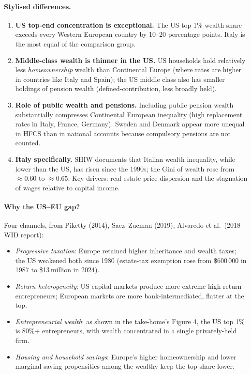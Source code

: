 \documentclass[11pt,a4paper]{article}
\begin{document}
\paragraph{Stylised differences.}
\begin{enumerate}[leftmargin=*,itemsep=1pt]
    \item \textbf{US top-end concentration is exceptional.} The US top 1\% wealth share exceeds every Western European country by 10--20 percentage points. Italy is the most equal of the comparison group.
    \item \textbf{Middle-class wealth is thinner in the US.} US households hold relatively less \emph{homeownership} wealth than Continental Europe (where rates are higher in countries like Italy and Spain); the US middle class also has smaller holdings of pension wealth (defined-contribution, less broadly held).
    \item \textbf{Role of public wealth and pensions.} Including public pension wealth substantially compresses Continental European inequality (high replacement rates in Italy, France, Germany). Sweden and Denmark appear more unequal in HFCS than in national accounts because compulsory pensions are not counted.
    \item \textbf{Italy specifically.} SHIW documents that Italian wealth inequality, while lower than the US, has risen since the 1990s; the Gini of wealth rose from $\approx 0.60$ to $\approx 0.65$. Key drivers: real-estate price dispersion and the stagnation of wages relative to capital income.
\end{enumerate}

\paragraph{Why the US--EU gap?}
Four channels, from Piketty (2014), Saez--Zucman (2019), Alvaredo et al.\ (2018 WID report):
\begin{itemize}[leftmargin=*,itemsep=1pt]
    \item \emph{Progressive taxation}: Europe retained higher inheritance and wealth taxes; the US weakened both since 1980 (estate-tax exemption rose from \$600\,000 in 1987 to \$13\,million in 2024).
    \item \emph{Return heterogeneity}: US capital markets produce more extreme high-return entrepreneurs; European markets are more bank-intermediated, flatter at the top.
    \item \emph{Entrepreneurial wealth}: as shown in the take-home's Figure 4, the US top 1\% is 80\%+ entrepreneurs, with wealth concentrated in a single privately-held firm.
    \item \emph{Housing and household savings}: Europe's higher homeownership and lower marginal saving propensities among the wealthy keep the top share lower.
\end{itemize}
\end{document}
